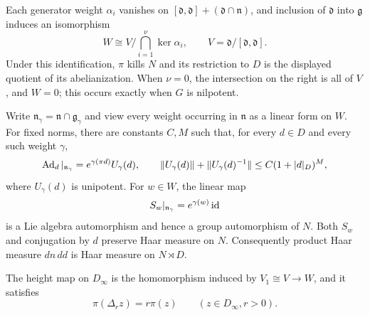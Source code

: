 \begin{lemma}
\label{lem:canonical-height}
Each generator weight $\alpha_i$ vanishes on
$[\mathfrak d,\mathfrak d]+(\mathfrak d\cap\mathfrak n)$, and inclusion
of $\mathfrak d$ into $\mathfrak g$ induces an isomorphism
\begin{equation}\label{eq:canonical-cartan-height}
 W\cong V\Big/\bigcap_{i=1}^\nu\ker\alpha_i,
 \qquad V=\mathfrak d/[\mathfrak d,\mathfrak d].
\end{equation}
Under this identification, $\pi$ kills $N$ and its restriction to $D$
is the displayed quotient of its abelianization.  When $\nu=0$, the
intersection on the right is all of $V$, and $W=0$; this occurs exactly
when $G$ is nilpotent.

Write $\mathfrak n_\gamma=\mathfrak n\cap\mathfrak g_\gamma$ and view
every weight occurring in $\mathfrak n$ as a linear form on $W$.
For fixed norms, there are constants $C,M$ such that, for every $d\in D$
and every such weight $\gamma$,
\begin{equation}\label{eq:d-polynomial-unipotent}
 \operatorname{Ad}_d|_{\mathfrak n_\gamma}
     =e^{\gamma(\pi d)}U_\gamma(d),\qquad
 \|U_\gamma(d)\|+\|U_\gamma(d)^{-1}\|
     \le C(1+|d|_D)^M,
\end{equation}
where $U_\gamma(d)$ is unipotent.  For $w\in W$, the linear map
\begin{equation}\label{eq:exact-weight-dilation}
 S_w|_{\mathfrak n_\gamma}=e^{\gamma(w)}\operatorname{id}
\end{equation}
is a Lie algebra automorphism and hence a group automorphism of $N$.
Both $S_w$ and conjugation by $d$ preserve Haar measure on $N$.
Consequently product Haar measure $dn\,dd$ is Haar measure on $N\rtimes D$.

The height map on $D_\infty$ is the homomorphism induced by
$V_1\cong V\to W$, and it satisfies
\begin{equation}\label{eq:d-height-scaling}
 \pi(\Delta_r z)=r\pi(z)
 \qquad(z\in D_\infty, r>0).
\end{equation}
\end{lemma}


